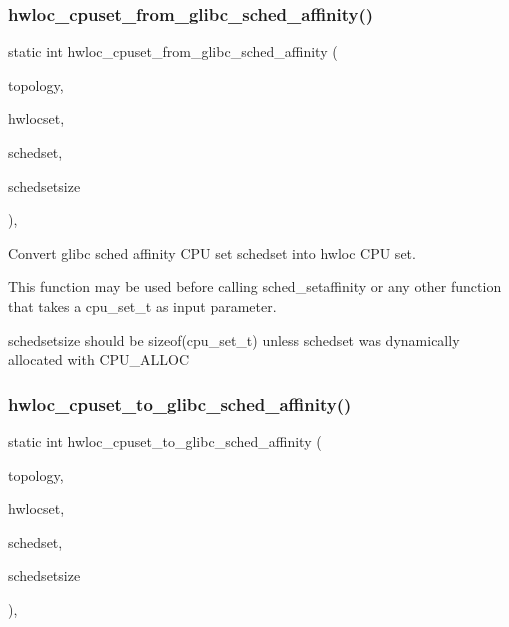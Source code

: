 \subsubsection{\texorpdfstring{hwloc\+\_\+cpuset\+\_\+from\+\_\+glibc\+\_\+sched\+\_\+affinity()}{hwloc\_cpuset\_from\_glibc\_sched\_affinity()}}
{\footnotesize\ttfamily static int hwloc\+\_\+cpuset\+\_\+from\+\_\+glibc\+\_\+sched\+\_\+affinity (\begin{DoxyParamCaption}\item[{\hyperlink{a00186_ga9d1e76ee15a7dee158b786c30b6a6e38}{hwloc\+\_\+topology\+\_\+t}}]{topology,  }\item[{\hyperlink{a00183_ga4bbf39b68b6f568fb92739e7c0ea7801}{hwloc\+\_\+cpuset\+\_\+t}}]{hwlocset,  }\item[{const cpu\+\_\+set\+\_\+t $\ast$}]{schedset,  }\item[{size\+\_\+t}]{schedsetsize }\end{DoxyParamCaption})\hspace{0.3cm}{\ttfamily [inline]}, {\ttfamily [static]}}



Convert glibc sched affinity C\+PU set {\ttfamily schedset} into hwloc C\+PU set. 

This function may be used before calling sched\+\_\+setaffinity or any other function that takes a cpu\+\_\+set\+\_\+t as input parameter.

{\ttfamily schedsetsize} should be sizeof(cpu\+\_\+set\+\_\+t) unless {\ttfamily schedset} was dynamically allocated with C\+P\+U\+\_\+\+A\+L\+L\+OC \mbox{\label{a00217_ga88699a0c86c66a9b7baa3468cd9d24c3}} 
\subsubsection{\texorpdfstring{hwloc\+\_\+cpuset\+\_\+to\+\_\+glibc\+\_\+sched\+\_\+affinity()}{hwloc\_cpuset\_to\_glibc\_sched\_affinity()}}
{\footnotesize\ttfamily static int hwloc\+\_\+cpuset\+\_\+to\+\_\+glibc\+\_\+sched\+\_\+affinity (\begin{DoxyParamCaption}\item[{\hyperlink{a00186_ga9d1e76ee15a7dee158b786c30b6a6e38}{hwloc\+\_\+topology\+\_\+t}}]{topology,  }\item[{\hyperlink{a00183_ga1f784433e9b606261f62d1134f6a3b25}{hwloc\+\_\+const\+\_\+cpuset\+\_\+t}}]{hwlocset,  }\item[{cpu\+\_\+set\+\_\+t $\ast$}]{schedset,  }\item[{size\+\_\+t}]{schedsetsize }\end{DoxyParamCaption})\hspace{0.3cm}{\ttfamily [inline]}, {\ttfamily [static]}}



